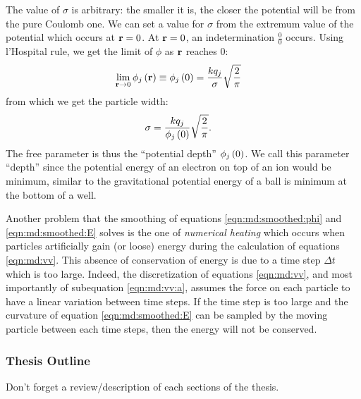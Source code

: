 The value of $\sigma$ is arbitrary: the smaller it is, the closer the potential
will be from the pure Coulomb one. We can set a value for $\sigma$ from the
extremum value of the potential which occurs at $\textbf{r} = 0$. At $\textbf{r} = 0$, an
indetermination $\frac{0}{0}$ occurs. Using l'Hospital rule, we get the limit
of $\phi$ as $\textbf{r}$ reaches 0:
\begin{align}
\lim_{\textbf{r} \rightarrow 0} \phi_j\left( \textbf{r} \right)
    & \equiv \phi_j\left( 0 \right) = \frac{ k q_j }{ \sigma } \sqrt{\frac{2}{\pi}}
\end{align}
from which we get the particle width:
\begin{align}
\sigma & = \frac{ k q_j }{ \phi_j\left( 0 \right) } \sqrt{ \frac{2}{\pi}}.
\label{eqn:md:sigma}
\end{align}
The free parameter is thus the ``potential depth'' $\phi_j\left( 0 \right)$. We call this
parameter ``depth'' since the potential energy of an electron on top of an ion
would be minimum, similar to the gravitational potential energy of a ball is
minimum at the bottom of a well.

Another problem that the smoothing of equations \eqref{eqn:md:smoothed:phi} and
\eqref{eqn:md:smoothed:E} solves is the one of \textit{numerical heating} which
occurs when particles artificially gain (or loose) energy during the
calculation of equations \eqref{eqn:md:vv}. This absence of conservation of
energy is due to a time step $\Delta t$ which is too large. Indeed, the
discretization of equations \eqref{eqn:md:vv}, and most importantly of
subequation \eqref{eqn:md:vv:a}, assumes the force on each particle to have a
linear variation between time steps. If the time step is too large and the
curvature of equation \eqref{eqn:md:smoothed:E} can be sampled by the moving
particle between each time steps, then the energy will not be conserved.






\subsubsection{Thesis Outline}
Don't forget a review/description of each sections of the thesis.



